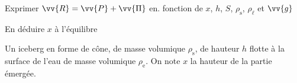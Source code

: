 \debutEntrainement


\begin{enonce}
Exprimer $\vv{R}=\vv{P}+\vv{\Pi}$ en. fonction de $x$, $h$, $S$, $\rho_\text{s}$, $\rho_\ell$ et $\vv{g}$
\end{enonce}

\reponse{}


\begin{enonce}
En déduire $x$ à l'équilibre
\end{enonce}

\reponse{}



\finEntrainement



\hauteurLargeurCadreReponse		{8mm}{3cm}
\initialisationEntrainement

                                \initialisationPartieGauche %
Un iceberg en forme de cône, de masse volumique $\rho_\text{s}$, de hauteur $h$ flotte à la surface de l'eau de masse volumique $\rho_\text{e}$. On note $x$ la hauteur de la partie émergée.


